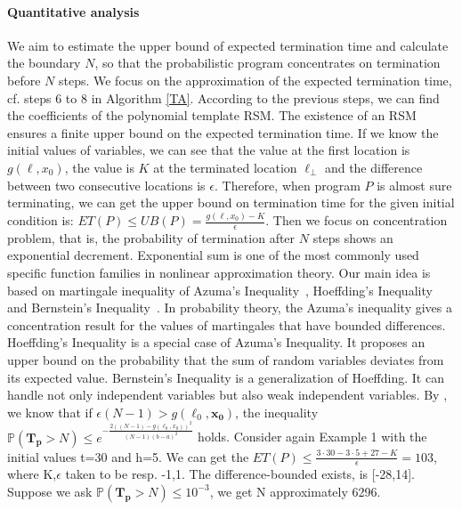 \documentclass[sigconf,review, anonymous]{acmart}
\begin{document}
\paragraph{Quantitative analysis} We aim to estimate the upper bound of expected termination time and calculate the boundary $N$, so that the probabilistic program concentrates on termination before $N$ steps. 
We focus on the approximation of the expected termination time, cf. steps 6 to 8 in Algorithm \ref{TA}. According to the previous steps, we can find the coefficients of the polynomial template RSM. The existence of an RSM ensures a finite upper bound on the expected termination time. If we know the initial values of variables, we can see that the value at the first location is $g(\ell, x_0)$, the value is $K$ at the terminated location $\ell_\bot$ and the difference between two consecutive locations is $\epsilon$.  Therefore, when program $P$ is almost sure terminating, we can get the upper bound on termination time for the given initial condition is: $ET(P) \leq UB(P) = \frac{g(\ell, x_0)-K}{\epsilon}$. 
Then we focus on concentration problem, that is, the probability of termination after $N$ steps shows an exponential decrement. Exponential sum is one of the most commonly used specific function families in nonlinear approximation theory. Our main idea is based on martingale inequality of Azuma's Inequality~\cite{Azuma1967}, Hoeffding's Inequality~\cite{Hoeffding1963,McDiarmid1998Concentration}  and Bernstein's Inequality~\cite{Bennett1962,McDiarmid1998Concentration}. In probability theory, the Azuma's inequality gives a concentration result for the values of martingales that have bounded differences. Hoeffding's Inequality is a special case of Azuma's Inequality. It proposes an upper bound on the probability that the sum of random variables deviates from its expected value. Bernstein's Inequality is a generalization of Hoeffding. It can handle not only independent variables but also weak independent variables. By \cite{cha2015algorithmic}, we know that if $\epsilon(N-1) > g(\ell_0,\boldsymbol{x_0})$, the inequality $\mathbb{P}(\bm{T_p} > N)\leq e^{-\frac{2((N-1)-g(\ell_0,x_0))^2}{(N-1)(b-a)^2}}$ holds. 
Consider again Example 1 with the initial values t=30 and h=5. We can get the $ET(P) \leq \frac{3\cdot 30-3\cdot 5+27-K}{\epsilon}=103$, where K,$\epsilon$ taken to be resp. -1,1. The difference-bounded exists, is [-28,14]. Suppose we ask $\mathbb{P}(\bm{T_p} > N)\leq 10^{-3}$, we get N approximately 6296.
\end{document}
